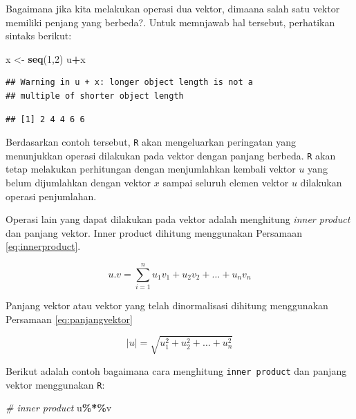 \documentclass[
]{book}
\newenvironment{Shaded}{\begin{snugshade}}{\end{snugshade}}
\newcommand{\CommentTok}[1]{\textcolor[rgb]{0.56,0.35,0.01}{\textit{#1}}}
\newcommand{\DecValTok}[1]{\textcolor[rgb]{0.00,0.00,0.81}{#1}}
\newcommand{\FunctionTok}[1]{\textcolor[rgb]{0.13,0.29,0.53}{\textbf{#1}}}
\newcommand{\NormalTok}[1]{#1}
\newcommand{\OtherTok}[1]{\textcolor[rgb]{0.56,0.35,0.01}{#1}}
\newcommand{\SpecialCharTok}[1]{\textcolor[rgb]{0.81,0.36,0.00}{\textbf{#1}}}
\theoremstyle{definition}
\theoremstyle{definition}
\theoremstyle{definition}
\theoremstyle{definition}
\theoremstyle{remark}
\begin{document}
Bagaimana jika kita melakukan operasi dua vektor, dimaana salah satu vektor memiliki penjang yang berbeda?. Untuk memnjawab hal tersebut, perhatikan sintaks berikut:

\begin{Shaded}
\begin{Highlighting}[]
\NormalTok{x }\OtherTok{\textless{}{-}} \FunctionTok{seq}\NormalTok{(}\DecValTok{1}\NormalTok{,}\DecValTok{2}\NormalTok{)}
\NormalTok{u}\SpecialCharTok{+}\NormalTok{x}
\end{Highlighting}
\end{Shaded}

\begin{verbatim}
## Warning in u + x: longer object length is not a
## multiple of shorter object length
\end{verbatim}

\begin{verbatim}
## [1] 2 4 4 6 6
\end{verbatim}

Berdasarkan contoh tersebut, \texttt{R} akan mengeluarkan peringatan yang menunjukkan operasi dilakukan pada vektor dengan panjang berbeda. \texttt{R} akan tetap melakukan perhitungan dengan menjumlahkan kembali vektor \(u\) yang belum dijumlahkan dengan vektor \(x\) sampai seluruh elemen vektor \(u\) dilakukan operasi penjumlahan.

Operasi lain yang dapat dilakukan pada vektor adalah menghitung \emph{inner product} dan panjang vektor. Inner product dihitung menggunakan Persamaan \eqref{eq:innerproduct}.

\begin{equation}
u.v=\sum_{i=1}^nu_1v_1+u_2v_2+\dots+u_nv_n
  \label{eq:innerproduct}
\end{equation}

Panjang vektor atau vektor yang telah dinormalisasi dihitung menggunakan Persamaan \eqref{eq:panjangvektor}

\begin{equation}
\left|u\right|=\sqrt{u_1^2+u_2^2+\dots+u_n^2}
  \label{eq:panjangvektor}
\end{equation}

Berikut adalah contoh bagaimana cara menghitung \texttt{inner\ product} dan panjang vektor menggunakan \texttt{R}:

\begin{Shaded}
\begin{Highlighting}[]
\CommentTok{\# inner product}
\NormalTok{u}\SpecialCharTok{\%*\%}\NormalTok{v}
\end{Highlighting}
\end{Shaded}
\end{document}
